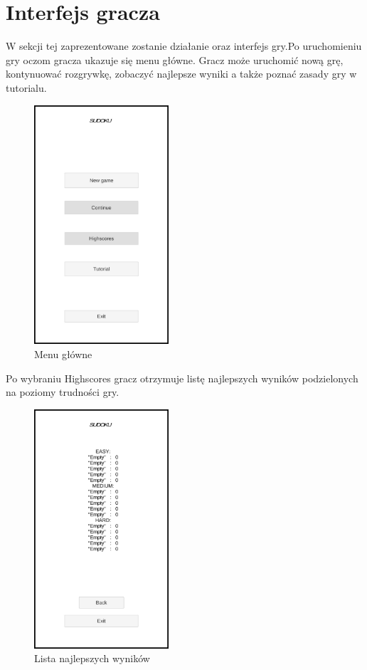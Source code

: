 \documentclass[a4paper, 11pt]{article}
\begin{document}
\section{Interfejs gracza}
W sekcji tej zaprezentowane zostanie działanie oraz interfejs gry.Po uruchomieniu gry oczom gracza ukazuje się menu główne. Gracz może uruchomić nową grę, kontynuować rozgrywkę, zobaczyć najlepsze wyniki a także poznać zasady gry w tutorialu.
\begin{figure}[H]
	\centering
	\includegraphics[width=5cm]{zrzuty/1.png}
	\caption{Menu główne}
	\label{fig:menu}
\end{figure}
Po wybraniu Highscores gracz otrzymuje listę najlepszych wyników podzielonych na poziomy trudności gry.
\begin{figure}[H]
	\centering
	\includegraphics[width=5cm]{zrzuty/12.png}
	\caption{Lista najlepszych wyników}
	\label{fig:highscores}
\end{figure}
\end{document}
